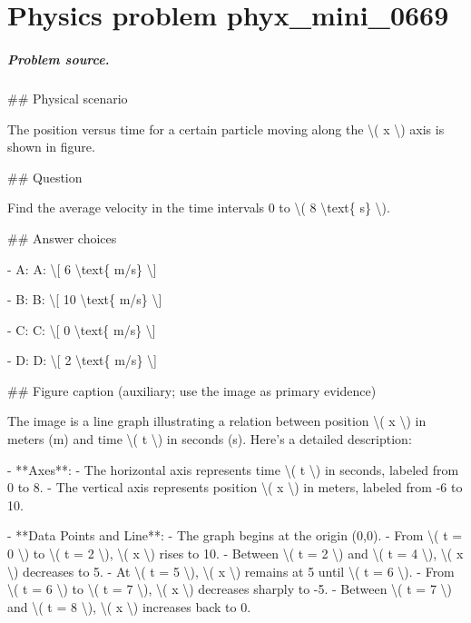 
\chapter{Physics problem phyx\_mini\_0669}
\label{ch:PhyXMiniProblems_problem_phyx_mini_0669}

\paragraph{Problem source.}
\#\# Physical scenario

The position versus time for a certain particle moving along the \textbackslash{}( x \textbackslash{}) axis is shown in figure.

\#\# Question

Find the average velocity in the time intervals 0 to \textbackslash{}( 8 \textbackslash{}text\{ s\} \textbackslash{}).

\#\# Answer choices

- A: A: \textbackslash{}[ 6 \textbackslash{}text\{ m/s\} \textbackslash{}]

- B: B: \textbackslash{}[ 10 \textbackslash{}text\{ m/s\} \textbackslash{}]

- C: C: \textbackslash{}[ 0 \textbackslash{}text\{ m/s\} \textbackslash{}]

- D: D: \textbackslash{}[ 2 \textbackslash{}text\{ m/s\} \textbackslash{}]

\#\# Figure caption (auxiliary; use the image as primary evidence)

The image is a line graph illustrating a relation between position \textbackslash{}( x \textbackslash{}) in meters (m) and time \textbackslash{}( t \textbackslash{}) in seconds (s). Here's a detailed description:

- **Axes**:
  - The horizontal axis represents time \textbackslash{}( t \textbackslash{}) in seconds, labeled from 0 to 8.
  - The vertical axis represents position \textbackslash{}( x \textbackslash{}) in meters, labeled from -6 to 10.

- **Data Points and Line**:
  - The graph begins at the origin (0,0).
  - From \textbackslash{}( t = 0 \textbackslash{}) to \textbackslash{}( t = 2 \textbackslash{}), \textbackslash{}( x \textbackslash{}) rises to 10.
  - Between \textbackslash{}( t = 2 \textbackslash{}) and \textbackslash{}( t = 4 \textbackslash{}), \textbackslash{}( x \textbackslash{}) decreases to 5.
  - At \textbackslash{}( t = 5 \textbackslash{}), \textbackslash{}( x \textbackslash{}) remains at 5 until \textbackslash{}( t = 6 \textbackslash{}).
  - From \textbackslash{}( t = 6 \textbackslash{}) to \textbackslash{}( t = 7 \textbackslash{}), \textbackslash{}( x \textbackslash{}) decreases sharply to -5.
  - Between \textbackslash{}( t = 7 \textbackslash{}) and \textbackslash{}( t = 8 \textbackslash{}), \textbackslash{}( x \textbackslash{}) increases back to 0.

